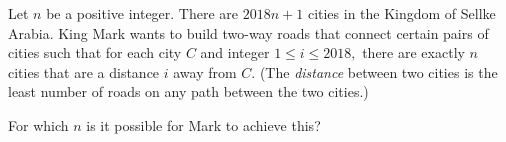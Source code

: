 Let $n$ be a positive integer. There are $2018n+1$ cities in the Kingdom of Sellke Arabia. King Mark wants to build two-way roads that connect certain pairs of cities such that for each city $C$ and integer $1\le i\le 2018,$ there are exactly $n$ cities that are a distance $i$ away from $C.$ (The \textit{distance} between two cities is the least number of roads on any path between the two cities.)

For which $n$ is it possible for Mark to achieve this?

